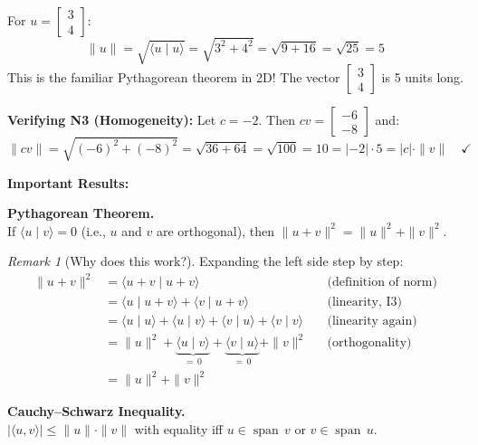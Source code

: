 \documentclass[11pt]{article}
\theoremstyle{definition}
\theoremstyle{plain}
\theoremstyle{remark}
\newtheorem{remark}[definition]{Remark}
\DeclareMathOperator{\spn}{span}
\begin{document}
\begin{workedexample}[title=\textbf{Worked Example: Computing a norm}]
For $u = \begin{bmatrix}3\\4\end{bmatrix}$:
\[
\|u\| = \sqrt{\langle u \mid u \rangle} = \sqrt{3^2 + 4^2} = \sqrt{9 + 16} = \sqrt{25} = 5
\]
This is the familiar Pythagorean theorem in 2D! The vector $\begin{bmatrix}3\\4\end{bmatrix}$ is 5 units long.

\medskip
\textbf{Verifying N3 (Homogeneity):} Let $c = -2$. Then $cv = \begin{bmatrix}-6\\-8\end{bmatrix}$ and:
\[
\|cv\| = \sqrt{(-6)^2 + (-8)^2} = \sqrt{36 + 64} = \sqrt{100} = 10 = |-2| \cdot 5 = |c| \cdot \|v\| \quad \checkmark
\]
\end{workedexample}

\medskip
\textbf{Important Results:}

\begin{resultbox}
\textbf{Pythagorean Theorem.} \\
If $\langle u \mid v \rangle = 0$ (i.e., $u$ and $v$ are orthogonal), then $\|u + v\|^2 = \|u\|^2 + \|v\|^2$.
\end{resultbox}

\begin{remark}[Why does this work?]
Expanding the left side step by step:
\begin{align*}
\|u + v\|^2 &= \langle u + v \mid u + v \rangle && \text{(definition of norm)} \\
&= \langle u \mid u + v \rangle + \langle v \mid u + v \rangle && \text{(linearity, I3)} \\
&= \langle u \mid u \rangle + \langle u \mid v \rangle + \langle v \mid u \rangle + \langle v \mid v \rangle && \text{(linearity again)} \\
&= \|u\|^2 + \underbrace{\langle u \mid v \rangle}_{=\,0} + \underbrace{\langle v \mid u \rangle}_{=\,0} + \|v\|^2 && \text{(orthogonality)} \\
&= \|u\|^2 + \|v\|^2
\end{align*}
\end{remark}

\begin{resultbox}
\textbf{Cauchy--Schwarz Inequality.} \\
$|\langle u, v \rangle| \leq \|u\| \cdot \|v\|$ with equality iff $u \in \spn\, v$ or $v \in \spn\, u$.
\end{resultbox}
\end{document}
